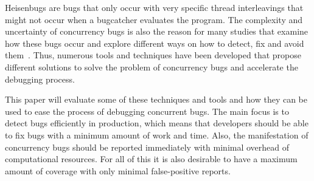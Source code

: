 \documentclass[conference]{IEEEtran}
\begin{document}
Heisenbugs are bugs that only occur with very specific thread interleavings that might not occur when a bugcatcher evaluates the program.
The complexity and uncertainty of concurrency bugs is also the reason for many studies that examine how these bugs occur and explore different ways on how to detect, fix and avoid them~\cite{tu2019go}.
Thus, numerous tools and techniques have been developed that propose different solutions to solve the problem of concurrency bugs and accelerate the debugging process.

This paper will evaluate some of these techniques and tools and how they can be used to ease the process of debugging concurrent bugs.
The main focus is to detect bugs efficiently in production, which means that developers should be able to fix bugs with a minimum amount of work and time.
Also, the manifestation of concurrency bugs should be reported immediately with minimal overhead of computational resources.
For all of this it is also desirable to have a maximum amount of coverage with only minimal false-positive reports.
\end{document}
